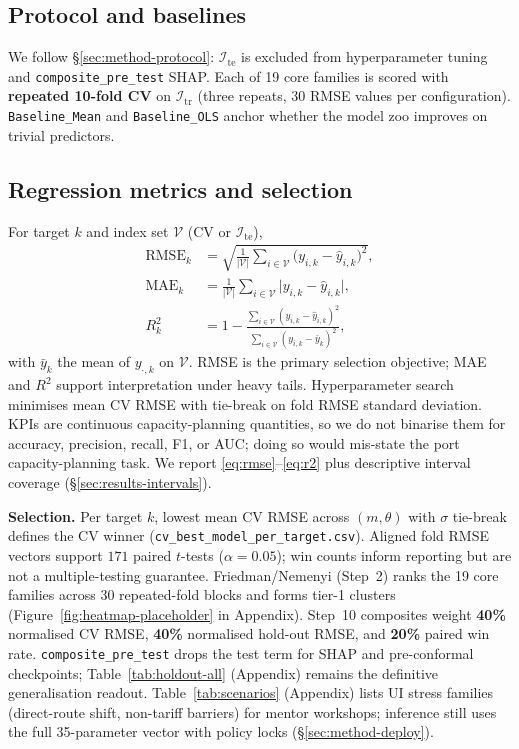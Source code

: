 \documentclass[10pt,twocolumn]{article}
\newcommand{\train}{\mathcal{I}_{\mathrm{tr}}}
\newcommand{\test}{\mathcal{I}_{\mathrm{te}}}
\begin{document}
\subsection{Protocol and baselines}
\label{sec:exp-protocol}

We follow \S\ref{sec:method-protocol}: $\test$ is excluded from hyperparameter tuning and \texttt{composite\_pre\_test} SHAP.
Each of 19 core families is scored with \textbf{repeated 10-fold CV} on $\train$ (three repeats, 30 RMSE values per configuration).
\texttt{Baseline\_Mean} and \texttt{Baseline\_OLS} anchor whether the model zoo improves on trivial predictors.

\subsection{Regression metrics and selection}
\label{sec:exp-metrics}

For target $k$ and index set $\mathcal{V}$ (CV or $\test$),
\begin{align}
  \mathrm{RMSE}_k &= \sqrt{\frac{1}{|\mathcal{V}|}\sum_{i\in\mathcal{V}} \bigl(y_{i,k}-\hat{y}_{i,k}\bigr)^2}, \label{eq:rmse}\\
  \mathrm{MAE}_k &= \frac{1}{|\mathcal{V}|}\sum_{i\in\mathcal{V}} \bigl|y_{i,k}-\hat{y}_{i,k}\bigr|, \label{eq:mae}\\
  R^2_k &= 1 - \frac{\sum_{i\in\mathcal{V}}(y_{i,k}-\hat{y}_{i,k})^2}{\sum_{i\in\mathcal{V}}(y_{i,k}-\bar{y}_k)^2}, \label{eq:r2}
\end{align}
with $\bar{y}_k$ the mean of $y_{\cdot,k}$ on $\mathcal{V}$.
RMSE is the primary selection objective; MAE and $R^2$ support interpretation under heavy tails.
Hyperparameter search minimises mean CV RMSE with tie-break on fold RMSE standard deviation.
KPIs are continuous capacity-planning quantities, so we do not binarise them for accuracy, precision, recall, F1, or AUC; doing so would mis-state the port capacity-planning task.
We report \eqref{eq:rmse}--\eqref{eq:r2} plus descriptive interval coverage (\S\ref{sec:results-intervals}).

\textbf{Selection.} Per target $k$, lowest mean CV RMSE across $(m,\theta)$ with $\sigma$ tie-break defines the CV winner (\texttt{cv\_best\_model\_per\_target.csv}).
Aligned fold RMSE vectors support $171$ paired $t$-tests ($\alpha{=}0.05$); win counts inform reporting but are not a multiple-testing guarantee.
Friedman/Nemenyi (Step~2) ranks the 19 core families across 30 repeated-fold blocks and forms tier-1 clusters (Figure~\ref{fig:heatmap-placeholder} in Appendix).
Step~10 composites weight \textbf{40\%} normalised CV RMSE, \textbf{40\%} normalised hold-out RMSE, and \textbf{20\%} paired win rate.
\texttt{composite\_pre\_test} drops the test term for SHAP and pre-conformal checkpoints; Table~\ref{tab:holdout-all} (Appendix) remains the definitive generalisation readout.
Table~\ref{tab:scenarios} (Appendix) lists UI stress families (direct-route shift, non-tariff barriers) for mentor workshops; inference still uses the full 35-parameter vector with policy locks (\S\ref{sec:method-deploy}).
\end{document}

